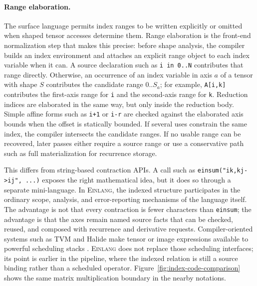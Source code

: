 \documentclass[sigplan,screen,nonacm]{acmart}
\newcommand{\einlang}{\textsc{Einlang}}
\begin{document}
\paragraph{Range elaboration.}
The surface language permits index ranges to be written explicitly or omitted when shaped tensor accesses determine them. Range elaboration is the front-end normalization step that makes this precise: before shape analysis, the compiler builds an index environment and attaches an explicit range object to each index variable when it can. A source declaration such as \texttt{i in 0..N} contributes that range directly. Otherwise, an occurrence of an index variable in axis $a$ of a tensor with shape $S$ contributes the candidate range $0..S_a$; for example, \texttt{A[i,k]} contributes the first-axis range for \texttt{i} and the second-axis range for \texttt{k}. Reduction indices are elaborated in the same way, but only inside the reduction body. Simple affine forms such as \texttt{i+1} or \texttt{i-r} are checked against the elaborated axis bounds when the offset is statically bounded. If several uses constrain the same index, the compiler intersects the candidate ranges. If no usable range can be recovered, later passes either require a source range or use a conservative path such as full materialization for recurrence storage.

This differs from string-based contraction APIs. A call such as \texttt{einsum("ik,kj->ij", ...)} exposes the right mathematical idea, but it does so through a separate mini-language. In \einlang{}, the indexed structure participates in the ordinary scope, analysis, and error-reporting mechanisms of the language itself. The advantage is not that every contraction is fewer characters than \texttt{einsum}; the advantage is that the axes remain named source facts that can be checked, reused, and composed with recurrence and derivative requests. Compiler-oriented systems such as TVM and Halide make tensor or image expressions available to powerful scheduling stacks \cite{tvm2018,halide2013}. \einlang{} does not replace those scheduling interfaces; its point is earlier in the pipeline, where the indexed relation is still a source binding rather than a scheduled operator. Figure~\ref{fig:index-code-comparison} shows the same matrix multiplication boundary in the nearby notations.
\end{document}
